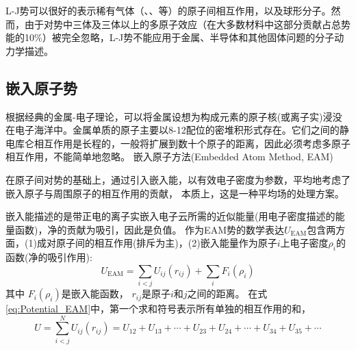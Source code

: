 \textrm{L-J}势可以很好的表示稀有气体（、、等）的原子间相互作用，以及球形分子。然而，由于对势中三体及三体以上的多原子效应（在大多数材料中这部分贡献占总势能的10\%）被完全忽略，\textrm{L-J}势不能应用于金属、半导体和其他固体问题的分子动力学描述。

\subsection{嵌入原子势}
根据经典的金属-电子理论，可以将金属设想为构成元素的原子核(或离子实)浸没在电子海洋中。金属单质的原子主要以8-12配位的密堆积形式存在。它们之间的静电库仑相互作用是长程的，一般将扩展到数十个原子的距离，因此必须考虑多原子相互作用，不能简单地忽略。%
嵌入原子方法\textrm{(Embedded Atom Method, EAM)}%

在原子间对势的基础上，通过引入嵌入能，以有效电子密度为参数，平均地考虑了嵌入原子与周围原子的相互作用的贡献\cite{PRB29-6443_1984,MSR9-251_1993}，%
本质上，这是一种平均场的处理方案。

嵌入能描述的是带正电的离子实嵌入电子云所需的近似能量(用电子密度描述的能量函数)，净的贡献为吸引，因此是负值。%
作为\textrm{EAM}势的数学表达$U_{\mathrm{EAM}}$包含两方面，\textrm{(1)}成对原子间的相互作用(排斥为主)，\textrm{(2)}嵌入能量作为原子$i$上电子密度$\rho_i$的函数(净的吸引作用):
\begin{equation}
	U_{\mathrm{EAM}}=\sum_{i<j}U_{ij}(r_{ij})+\sum_iF_i(\rho_i)
	\label{eq:Potential_EAM}
\end{equation}
其中
$F_i(\rho_i)$是嵌入能函数，
$r_{ij}$是原子$i$和$j$之间的距离。
在式\eqref{eq:Potential_EAM}中，第一个求和符号表示所有单独的相互作用的和，%
\begin{equation}
	U=\sum_{i<j}^NU_{ij}(r_{ij})=U_{12}+U_{13}+\cdots+U_{23}+U_{24}+\cdots+U_{34}+U_{35}+\cdots
	\label{eq:EAM_pair}
\end{equation}

